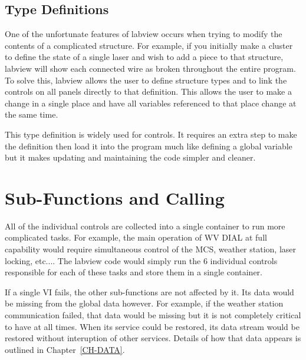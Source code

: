 \subsection{Type Definitions}

One of the unfortunate features of labview occurs when trying to modify the contents of a complicated structure. For example, if you initially make a cluster to define the state of a single laser and wish to add a piece to that structure, labview will show each connected wire as broken throughout the entire program. To solve this, labview allows the user to define structure types and to link the controls on all panels directly to that definition. This allows the user to make a change in a single place and have all variables referenced to that place change at the same time. 

This type definition is widely used for controls. It requires an extra step to make the definition then load it into the program much like defining a global variable but it makes updating and maintaining the code simpler and cleaner. 

\section{Sub-Functions and Calling}

All of the individual controls are collected into a single container to run more complicated tasks. For example, the main operation of WV DIAL at full capability would require simultaneous control of the MCS, weather station, laser locking, etc.... The labview code would simply run the 6 individual controls responsible for each of these tasks and store them in a single container. 

If a single VI fails, the other sub-functions are not affected by it. Its data would be missing from the global data however. For example, if the weather station communication failed, that data would be missing but it is not completely critical to have at all times. When its service could be restored, its data stream would be restored without interuption of other services. Details of how that data appears is outlined in Chapter~\ref{CH-DATA}.

\newpage 
